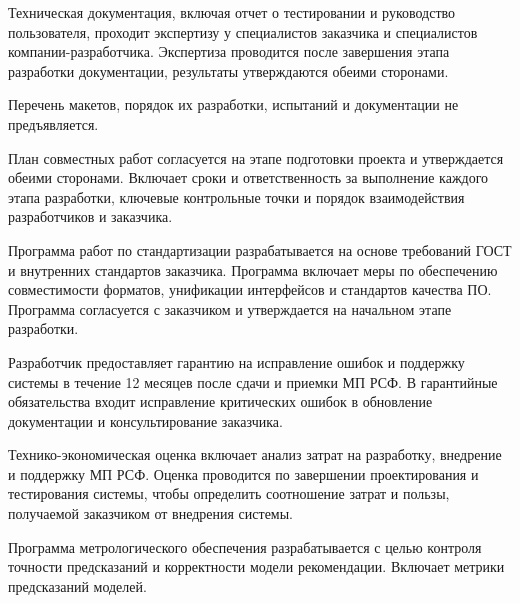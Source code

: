 Техническая документация, включая отчет о тестировании
и руководство пользователя, проходит экспертизу у специалистов заказчика
и специалистов компании-разработчика.
Экспертиза проводится после завершения этапа разработки документации,
результаты утверждаются обеими сторонами.


Перечень макетов, порядок их разработки, испытаний
и документации не предъявляется.


План совместных работ согласуется на этапе подготовки проекта
и утверждается обеими сторонами.
Включает сроки и ответственность за выполнение каждого этапа разработки,
ключевые контрольные точки и порядок взаимодействия разработчиков и заказчика.


Программа работ по стандартизации разрабатывается на основе требований ГОСТ
и внутренних стандартов заказчика.
Программа включает меры по обеспечению совместимости форматов,
унификации интерфейсов и стандартов качества ПО.
Программа согласуется с заказчиком
и утверждается на начальном этапе разработки.


Разработчик предоставляет гарантию на исправление ошибок
и поддержку системы в течение 12 месяцев после сдачи и приемки МП РСФ.
В гарантийные обязательства входит исправление критических ошибок
в обновление документации и консультирование заказчика.


Технико-экономическая оценка включает анализ затрат на разработку,
внедрение и поддержку МП РСФ.
Оценка проводится по завершении проектирования и тестирования системы,
чтобы определить соотношение затрат и пользы,
получаемой заказчиком от внедрения системы.


Программа метрологического обеспечения
разрабатывается с целью контроля точности предсказаний
и корректности модели рекомендации.
Включает метрики предсказаний моделей.


